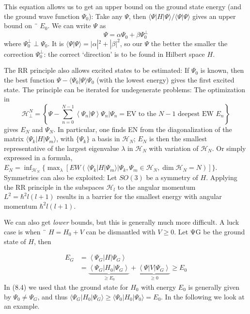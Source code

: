 This equation allows us to get an upper bound on the ground state energy (and the ground wave function $\Psi_0$): Take any $\Psi$, then $\langle \Psi|H|\Psi\rangle/\langle\Psi|\Psi\rangle$ gives an upper bound on ¨ $E_0$. We can write $\Psi$ as
\begin{equation}
    \Psi=\alpha \Psi_{0}+\beta \Psi_{0}^{\perp}
    \end{equation}
where $\Psi_0^{\perp}\perp\Psi_0$. It is $\langle\Psi|\Psi\rangle = |\alpha|^2+|\beta|^2$, so our $\Psi$ the better the smaller the correction $\Psi_0^{\perp}$: the correct ‘direction’ is to be found in Hilbert space $H$.\par
The RR principle also allows excited states to be estimated: If $\Psi_0$ is known, then the best function $\Psi-\langle\Psi_0|\Psi\rangle\Psi_0$ (with the lowest energy) gives the first excited state. The principle can be iterated for undegenerate problems:
The optimization in
$$
    \mathcal{H}_{\perp}^{N}=\left\{\Psi-\sum_{n=0}^{N-1}\left\langle\Psi_{n} | \Psi\right\rangle \Psi_{n} | \Psi_{n}=\mathrm{E} \mathrm{V} \text { to the } N-1 \text { deepest EW } E_{n}\right\}
$$
gives $E_N$ and $\Psi_N$. In particular, one finds EN from the diagonalization of the matrix $\langle\Psi_k|H|\Psi_m\rangle$, with $\{\Psi_k\}$ a basis in $\mathcal{H}_N$; $E_N$ is then the smallest representative of the largest eigenvalue $\lambda$ in $\mathcal{H}_N$ with variation of $\mathcal{H}_N$. Or simply expressed in a formula, $E_N=\operatorname{inf}_{\mathcal{H}_N}\{\operatorname{max}_{\lambda}[EW(\langle\Psi_k|H|\Psi_m\rangle|\Psi_k,\Psi_m\in\mathcal{H}_N,\operatorname{dim}\mathcal{H}_N=N)]\}$. Symmetries can also be exploited: Let $SO (3)$ be a symmetry of $H$. Applying the RR principle in the subspaces $\mathcal{H}_l$ to the angular momentum $L^2 = \hbar^2l (l + 1)$ results in a barrier for the smallest energy with angular momentum $\hbar^2l (l + 1)$.
\par
We can also get \textit{lower} bounds, but this is generally much more difficult. A luck case is when ¨ $H = H_0 + V$ can be dismantled with $V \geq 0$. Let ΨG be the ground state of $H$, then

\begin{equation}
\begin{aligned} E_{G} &=\left\langle\Psi_{G}|H| \Psi_{G}\right\rangle \\ &=\underbrace{\left\langle\Psi_{G}\left|H_{0}\right| \Psi_{G}\right\rangle}_{\geq E_{0}}+\underbrace{\left\langle\Psi|V| \Psi_{G}\right\rangle}_{\geq 0} \geq E_{0} \end{aligned}
\end{equation}
In (8.4) we used that the ground state for $H_0$ with energy $E_0$ is generally given by $\Psi_0\neq\Psi_G$, and thus $\langle\Psi_G|H_0|\Psi_G\rangle\geq\langle\Psi_0|H_0|\Psi_0\rangle=E_0$. In the following we look at an example.

